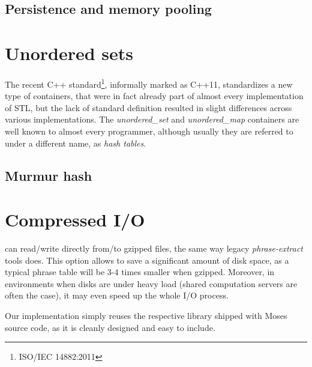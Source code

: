 \subsection{Persistence and memory pooling}


\section{Unordered sets}

The recent C++ standard\footnote{ISO/IEC 14882:2011}, informally marked as C++11, standardizes
a new type of containers, that were in fact already part of almost every implementation of STL,
but the lack of standard definition resulted in slight differences across various implementations.
The \emph{unordered_set} and \emph{unordered_map} containers are well known to almost every
programmer, although usually they are referred to under a different name, as \emph{hash tables}.

\subsection{Murmur hash}

\section{Compressed I/O}

\Eppex{} can read/write directly from/to gzipped files, the same way legacy \emph{phrase-extract}
tools does.
This option allows to save a significant amount of disk space, as a typical phrase table will be
3-4 times smaller when gzipped. %
Moreover, in environments when disks are under heavy load (shared computation servers are often
the case), it may even speed up the whole I/O process.

Our implementation simply reuses the respective library shipped with Moses source code,
as it is cleanly designed and easy to include.
